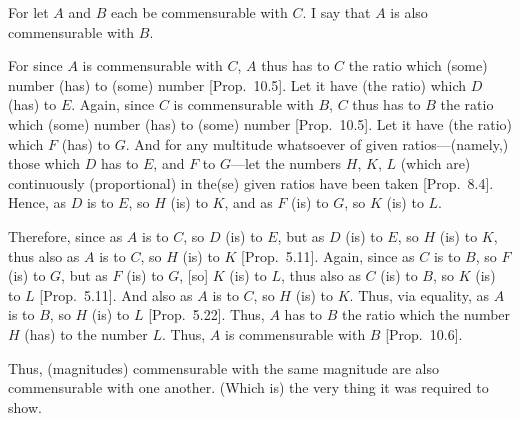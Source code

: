 \begin{Parallel}{}{}
{For let $A$ and $B$ each be commensurable with $C$. I say that
$A$ is also commensurable with $B$.

For since $A$ is commensurable with $C$, $A$ thus has to $C$ the
ratio which (some) number (has) to (some) number [Prop.~10.5]. Let it have (the ratio) which $D$ (has)
to $E$. Again, since $C$ is commensurable with $B$, $C$ thus has to $B$
the ratio which (some) number (has) to (some) number [Prop.~10.5].  Let it have (the ratio) which $F$ (has) to $G$. And for any multitude whatsoever of given ratios---(namely,) those
which $D$ has to $E$, and $F$ to $G$---let the numbers $H$, $K$, $L$
(which are) continuously (proportional) in the(se) given ratios have been taken [Prop.~8.4]. Hence, as $D$ is to $E$, so $H$ (is) to $K$, and as $F$ (is) to $G$, so $K$ (is) to $L$.

\centerline{}

Therefore, since as $A$ is to $C$, so $D$ (is) to $E$, but as $D$ (is) to 
$E$, so $H$ (is) to $K$, thus also as $A$ is to $C$, so $H$ (is) to $K$
[Prop.~5.11]. Again, since as $C$ is to $B$, 
so $F$ (is) to $G$, but as $F$ (is) to $G$, [so] $K$ (is) to $L$, 
thus also as $C$ (is) to $B$, so $K$ (is) to $L$ [Prop.~5.11]. And also as $A$ is to $C$, so $H$ (is) to $K$. Thus, via equality, as $A$ is to $B$, so $H$ (is) to $L$ [Prop.~5.22]. Thus, $A$ has to $B$ the ratio
which the number $H$ (has) to the number $L$. Thus, $A$ is commensurable
with $B$ [Prop.~10.6].

Thus, (magnitudes) commensurable with the same magnitude are also commensurable with one another. (Which is) the very thing it was required
to show.}
\end{Parallel}

